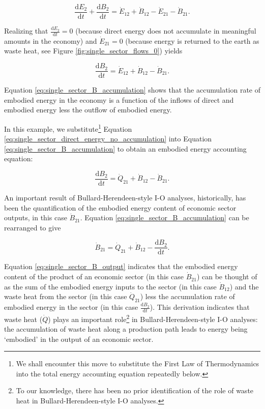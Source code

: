 \documentclass[authoryear,preprint,review,12pt]{elsarticle}
\begin{document}
\begin{equation} \label{eq:single_sector_T_with_accumulation_expanded_T}
	\frac{\mathrm{d}E_{2}}{\mathrm{d}t} + \frac{\mathrm{d}B_{2}}{\mathrm{d}t} = \dot{E}_{12} + \dot{B}_{12} - \dot{E}_{21} - \dot{B}_{21}.
\end{equation}

\noindent Realizing that $\frac{\mathrm{d}E_2}{\mathrm{d}t} = 0$ (because direct energy does not accumulate in meaningful amounts in the economy) and $\dot{E}_{21} = 0$ (because energy is returned to the earth as waste heat, see Figure \ref{fig:single_sector_flows_0}) yields

\begin{equation} \label{eq:single_sector_B_accumulation}
	\frac{\mathrm{d}B_{2}}{\mathrm{d}t} = \dot{E}_{12} + \dot{B}_{12} - \dot{B}_{21}.
\end{equation}

\noindent Equation \ref{eq:single_sector_B_accumulation} shows that the accumulation rate of embodied energy in the economy is a function of the inflows of direct and embodied energy less the outflow of embodied energy. 

In this example, we substitute\footnote{We shall encounter this move to substitute the First Law of Thermodynamics into the total energy accounting equation repeatedly below.} Equation \ref{eq:single_sector_direct_energy_no_accumulation} into Equation \ref{eq:single_sector_B_accumulation} to obtain an embodied energy accounting equation:

\begin{equation} \label{eq:embodied_energy_accounting}
	\frac{\mathrm{d}B_{2}}{\mathrm{d}t} = \dot{Q}_{21} + \dot{B}_{12} - \dot{B}_{21}.
\end{equation}

An important result of Bullard-Herendeen-style I-O analyses, historically, has been the quantification of the embodied energy content of economic sector outputs, in this case $\dot{B}_{21}$. Equation \ref{eq:single_sector_B_accumulation} can be rearranged to give

\begin{equation} \label{eq:single_sector_B_output}
	\dot{B}_{21} = \dot{Q}_{21} + \dot{B}_{12} - \frac{\mathrm{d}B_{2}}{\mathrm{d}t}.
\end{equation}

Equation \ref{eq:single_sector_B_output} indicates that the embodied energy content of the product of an economic sector (in this case $\dot{B}_{21}$) can be thought of as the sum of the embodied energy inputs to the sector (in this case $\dot{B}_{12}$) and the waste heat from the sector (in this case $\dot{Q}_{21}$) less the accumulation rate of embodied energy in the sector (in this case $\frac{\mathrm{d}B_{2}}{\mathrm{d}t}$). This derivation indicates that waste heat ($\dot{Q}$) plays an important role\footnote{To our knowledge, there has been no prior identification of the role of waste heat in Bullard-Herendeen-style I-O analyses.} in Bullard-Herendeen-style I-O analyses: the accumulation of waste heat along a production path leads to energy being `embodied' in the output of an economic sector. 
\end{document}
